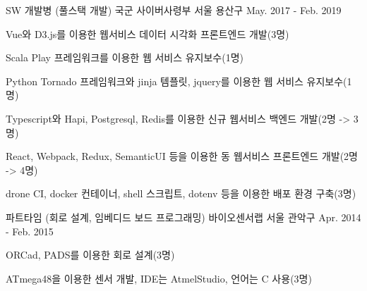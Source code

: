 

\begin{cventries}

  \cventry
    {SW 개발병 (풀스택 개발)} %
    {국군 사이버사령부} %
    {서울 용산구} %
    {May. 2017 - Feb. 2019} %
    {
      \begin{cvitems} %
        \item {Vue와 D3.js를 이용한 웹서비스 데이터 시각화 프론트엔드 개발(3명)}
        \item {Scala Play 프레임워크를 이용한 웹 서비스 유지보수(1명)}
        \item {Python Tornado 프레임워크와 jinja 템플릿, jquery를 이용한 웹 서비스 유지보수(1명)}
        \item {Typescript와 Hapi, Postgresql, Redis를 이용한 신규 웹서비스 백엔드 개발(2명 -> 3명)}
        \item {React, Webpack, Redux, SemanticUI 등을 이용한 동 웹서비스 프론트엔드 개발(2명 -> 4명)}
        \item {drone CI, docker 컨테이너, shell 스크립트, dotenv 등을 이용한 배포 환경 구축(3명)}
      \end{cvitems}
    }
 
  \cventry
    {파트타임 (회로 설계, 임베디드 보드 프로그래밍)} %
    {바이오센서랩} %
    {서울 관악구} %
    {Apr. 2014 - Feb. 2015} %
    {
      \begin{cvitems} %
        \item {ORCad, PADS를 이용한 회로 설계(3명)}
        \item {ATmega48을 이용한 센서 개발, IDE는 AtmelStudio, 언어는 C 사용(3명)}
      \end{cvitems}
    }

\end{cventries}
